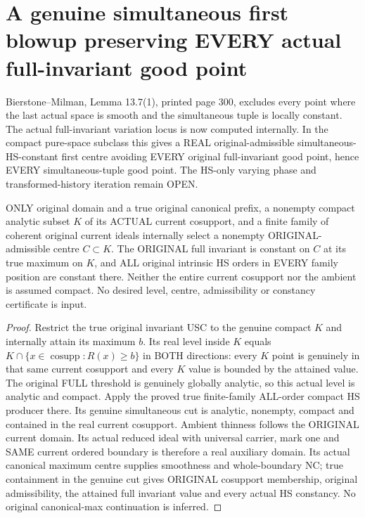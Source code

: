\section{A genuine simultaneous first blowup preserving EVERY actual full-invariant good point}

Bierstone--Milman\cite{bierstone-milman97-invent-math}, Lemma 13.7(1),
printed page 300, excludes every point where the last actual space is smooth
and the simultaneous tuple is locally constant. The actual full-invariant
variation locus is now computed internally. In the compact pure-space
subclass this gives a REAL original-admissible simultaneous-HS-constant
first centre avoiding EVERY original full-invariant good point, hence
EVERY simultaneous-tuple good point. The HS-only varying phase and
transformed-history iteration remain OPEN.

\begin{lemma}
\label{hir:original-compact-analytic-subset-simultaneous-first-centre}
\leanok
ONLY original domain and a true original canonical prefix, a nonempty
compact analytic subset $K$ of its ACTUAL current cosupport, and a finite
family of coherent original current ideals internally select a nonempty
ORIGINAL-admissible centre $C\subset K$. The ORIGINAL full invariant is
constant on $C$ at its true maximum on $K$, and ALL original intrinsic HS
orders in EVERY family position are constant there. Neither the entire
current cosupport nor the ambient is assumed compact. No desired level,
centre, admissibility or constancy certificate is input.
\end{lemma}
\begin{proof}
Restrict the true original invariant USC to the genuine compact $K$ and
internally attain its maximum $b$. Its real level inside $K$ equals
$K\cap\{x\in\operatorname{cosupp}:R(x)\ge b\}$ in BOTH directions: every
$K$ point is genuinely in that same current cosupport and every $K$ value
is bounded by the attained value. The original FULL threshold is genuinely
globally analytic, so this actual level is analytic and compact. Apply the
proved true finite-family ALL-order compact HS producer there. Its genuine
simultaneous cut is analytic, nonempty, compact and contained in the real
current cosupport. Ambient thinness follows the ORIGINAL current domain.
Its actual reduced ideal with universal carrier, mark one and SAME current
ordered boundary is therefore a real auxiliary domain. Its actual canonical
maximum centre supplies smoothness and whole-boundary NC; true containment
in the genuine cut gives ORIGINAL cosupport membership, original
admissibility, the attained full invariant value and every actual HS
constancy. No original canonical-max continuation is inferred.
\end{proof}

